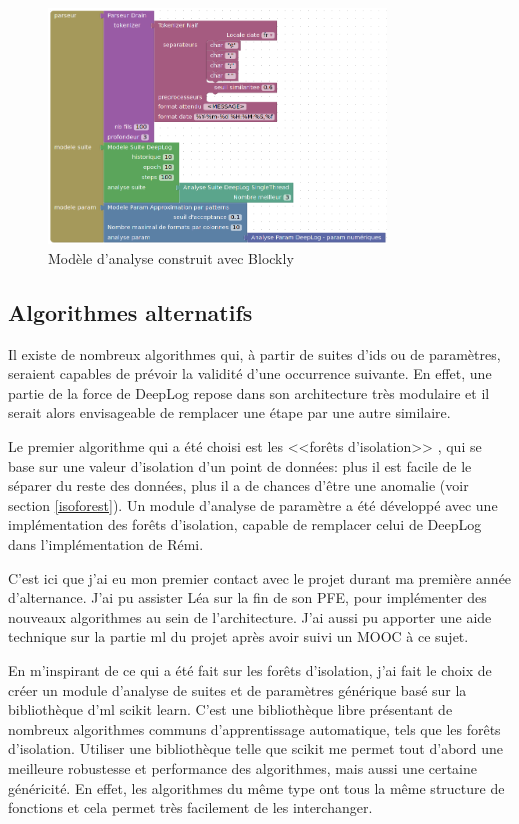 \documentclass[openany, 11pt]{memoir}
\begin{document}
\begin{figure}[ht]
	\centering
	\includegraphics[width=0.8\textwidth]{images/blockly_deeplog.png}
	\caption{Modèle d'analyse construit avec Blockly}
	\label{blocklydeeplog}
\end{figure}

\subsection{Algorithmes alternatifs}

Il existe de nombreux algorithmes qui, à partir de suites d'ids ou de paramètres, seraient capables de prévoir la validité d'une occurrence suivante. En effet, une partie de la force de DeepLog repose dans son architecture très modulaire et il serait alors envisageable de remplacer une étape par une autre similaire.

Le premier algorithme qui a été choisi est les <<forêts d'isolation>> \cite{isolationforest}, qui se base sur une valeur d'isolation d'un point de données: plus il est facile de le séparer du reste des données, plus il a de chances d'être une anomalie (voir section \ref{isoforest}). Un module d'analyse de paramètre a été développé avec une implémentation des forêts d'isolation, capable de remplacer celui de DeepLog dans l'implémentation de Rémi.

\bigskip
C'est ici que j'ai eu mon premier contact avec le projet durant ma première année d'alternance. J'ai pu assister Léa sur la fin de son PFE, pour implémenter des nouveaux algorithmes au sein de l'architecture. J'ai aussi pu apporter une aide technique sur la partie \gls{ml} du projet après avoir suivi un MOOC à ce sujet.

En m'inspirant de ce qui a été fait sur les forêts d'isolation, j'ai fait le choix de créer un module d'analyse de suites et de paramètres générique basé sur la bibliothèque d'\gls{ml} scikit learn. C'est une bibliothèque libre présentant de nombreux algorithmes communs d'apprentissage automatique, tels que les forêts d'isolation. Utiliser une bibliothèque telle que scikit me permet tout d'abord une meilleure robustesse et performance des algorithmes, mais aussi une certaine généricité. En effet, les algorithmes du même type ont tous la même structure de fonctions et cela permet très facilement de les interchanger.
\end{document}
